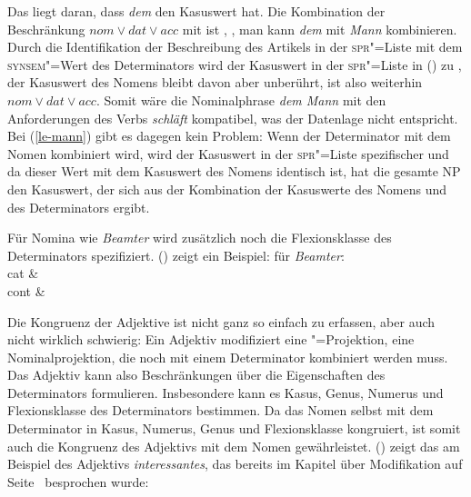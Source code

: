 \z
{}
\z
Das liegt daran, dass \emph{dem} den Kasuswert  hat. Die Kombination der Beschränkung
$nom \vee dat \vee acc$ mit  ist , \dash, man kann \emph{dem}
mit \emph{Mann} kombinieren. Durch die Identifikation der Beschreibung des Artikels
in der \textsc{spr}"=Liste mit dem \textsc{synsem}"=Wert des Determinators wird der Kasuswert
in der \textsc{spr}"=Liste in () zu , der Kasuswert des Nomens bleibt
davon aber unberührt, ist also weiterhin $nom \vee dat \vee acc$. Somit wäre die Nominalphrase
\emph{dem Mann} mit den Anforderungen des Verbs \emph{schläft} kompatibel, was der
Datenlage nicht entspricht.
Bei (\ref{le-mann}) gibt es dagegen kein Problem: Wenn der Determinator mit dem Nomen
kombiniert wird, wird der Kasuswert in der \textsc{spr}"=Liste spezifischer und da dieser
Wert mit dem Kasuswert des Nomens identisch ist, hat die gesamte NP den Kasuswert, der
sich aus der Kombination der Kasuswerte des Nomens und des Determinators ergibt.


Für Nomina wie \emph{Beamter} wird zusätzlich noch die Flexionsklasse des Determinators
spezifiziert. () zeigt ein Beispiel:
\ea
\label{le-beamter}
\localw für \emph{Beamter}:\\
\ms
{ cat &  \\
  cont &  \\
}
\z

\noindent
Die Kongruenz der Adjektive ist nicht ganz so einfach zu erfassen, aber auch nicht wirklich schwierig:
Ein Adjektiv modifiziert eine \nbar"=Projektion, \dash eine Nominalprojektion, die noch mit einem Determinator
kombiniert werden muss. Das Adjektiv kann also Beschränkungen über die Eigenschaften des Determinators
formulieren. Insbesondere kann es Kasus, Genus, Numerus und Flexionsklasse des Determinators bestimmen.
Da das Nomen selbst mit dem Determinator in Kasus, Numerus, Genus und Flexionsklasse kongruiert, ist somit
auch die Kongruenz des Adjektivs mit dem Nomen gewährleistet. () zeigt das am Beispiel
des Adjektivs \emph{interessantes}, das bereits im Kapitel über Modifikation auf Seite~\pageref{le-interessantes-sem}
besprochen wurde:

